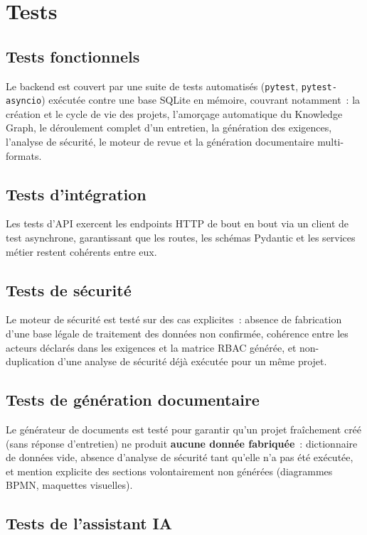 \chapter{Tests}

\section{Tests fonctionnels}
Le backend est couvert par une suite de tests automatisés (\texttt{pytest},
\texttt{pytest-asyncio}) exécutée contre une base SQLite en mémoire, couvrant notamment~:
la création et le cycle de vie des projets, l'amorçage automatique du Knowledge Graph,
le déroulement complet d'un entretien, la génération des exigences, l'analyse de
sécurité, le moteur de revue et la génération documentaire multi-formats.


\section{Tests d'intégration}
Les tests d'API exercent les endpoints HTTP de bout en bout via un client de test
asynchrone, garantissant que les routes, les schémas Pydantic et les services métier
restent cohérents entre eux.

\section{Tests de sécurité}
Le moteur de sécurité est testé sur des cas explicites~: absence de fabrication d'une
base légale de traitement des données non confirmée, cohérence entre les acteurs
déclarés dans les exigences et la matrice RBAC générée, et non-duplication d'une
analyse de sécurité déjà exécutée pour un même projet.

\section{Tests de génération documentaire}
Le générateur de documents est testé pour garantir qu'un projet fraîchement créé (sans
réponse d'entretien) ne produit \textbf{aucune donnée fabriquée}~: dictionnaire de
données vide, absence d'analyse de sécurité tant qu'elle n'a pas été exécutée, et
mention explicite des sections volontairement non générées (diagrammes BPMN, maquettes
visuelles).

\section{Tests de l'assistant IA}

